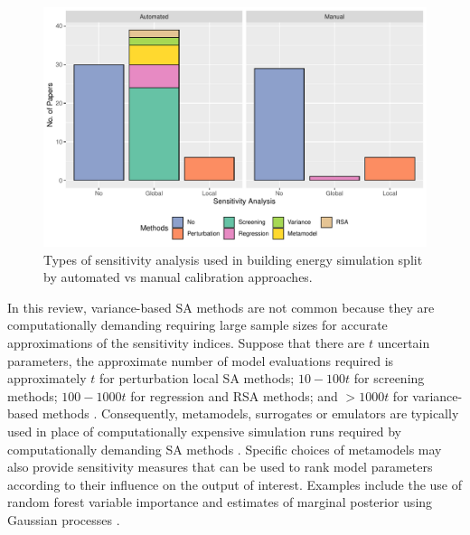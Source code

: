 \documentclass[review]{elsarticle}
\begin{document}
\begin{figure}[h!]
\centering
\includegraphics[width=\textwidth]{figures/sa.pdf}
\caption{Types of sensitivity analysis used in building energy simulation split by automated vs manual calibration approaches.}
\label{fig:sa}
\end{figure}

In this review, variance-based SA methods are not common because they are computationally demanding requiring large sample sizes for accurate approximations of the sensitivity indices. Suppose that there are $t$ uncertain parameters, the approximate number of model evaluations required is approximately $t$ for perturbation local SA methods; $10-100 t$ for screening methods; $100-1000 t$ for regression and RSA methods; and $>1000t$ for variance-based methods \cite{pianosi2016sensitivity}. Consequently, metamodels, surrogates or emulators are typically used in place of computationally expensive simulation runs required by computationally demanding SA methods \cite{pianosi2016sensitivity}. Specific choices of metamodels may also provide sensitivity measures that can be used to rank model parameters according to their influence on the output of interest. Examples include the use of random forest variable importance \cite{tian2016identifying, lim2017comprehensive, lim2018influences} and estimates of marginal posterior using Gaussian processes \cite{yuan2017simultaneous}.
\end{document}
